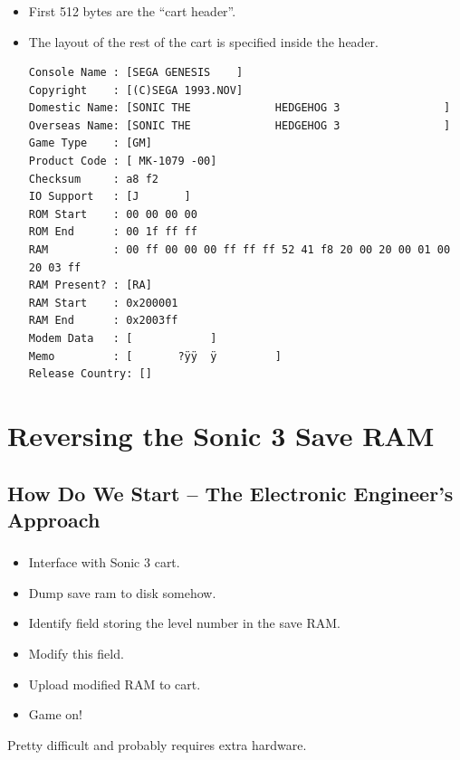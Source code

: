 \documentclass{beamer}
\begin{document}
\begin{frame}[fragile]
\frametitle{\insertsubsection}

\begin{itemize}
\item First 512 bytes are the ``cart header''.
\item The layout of the rest of the cart is specified inside the header.

\vfill

\begin{lstlisting}[basicstyle={\tt\tiny}]
% ./dgm_hdump ~/roms/Sonic\ the\ Hedgehog\ 3.bin 
Console Name : [SEGA GENESIS    ]
Copyright    : [(C)SEGA 1993.NOV]
Domestic Name: [SONIC THE             HEDGEHOG 3                ]
Overseas Name: [SONIC THE             HEDGEHOG 3                ]
Game Type    : [GM]
Product Code : [ MK-1079 -00]
Checksum     : a8 f2 
IO Support   : [J       ]
ROM Start    : 00 00 00 00 
ROM End      : 00 1f ff ff 
RAM          : 00 ff 00 00 00 ff ff ff 52 41 f8 20 00 20 00 01 00 20 03 ff 
RAM Present? : [RA]
RAM Start    : 0x200001
RAM End      : 0x2003ff
Modem Data   : [            ]
Memo         : [       ?ÿÿ  ÿ         ]
Release Country: []
\end{lstlisting}

\end{itemize}

\end{frame}


\section{Reversing the Sonic 3 Save RAM}

\subsection{How Do We Start -- The Electronic Engineer's Approach}

\begin{frame}[fragile]
\frametitle{\insertsubsection}

\begin{itemize}
\item Interface with Sonic 3 cart.
\item Dump save ram to disk somehow.
\item Identify field storing the level number in the save RAM.
\item Modify this field.
\item Upload modified RAM to cart.
\item Game on!
\end{itemize}

\vfill

Pretty difficult and probably requires extra hardware.

\end{frame}
\end{document}
